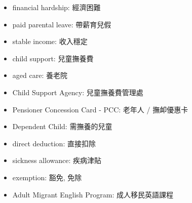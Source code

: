 \begin{multicols}{2}
\begin{itemize}
  \item financial hardship: 經濟困難
  \item paid parental leave: 帶薪育兒假
  \item stable income: 收入穩定
  \item child support: 兒童撫養費
  \item aged care: 養老院
  \item Child Support Agency: 兒童撫養費管理處
  \item Pensioner Concession Card - PCC: 老年人 / 撫卹優惠卡
  \item Dependent Child: 需撫養的兒童
  \item direct deduction: 直接扣除
  \item sickness allowance: 疾病津貼
  \item exemption: 豁免, 免除
  \item Adult Migrant English Program: 成人移民英語課程
\end{itemize}
\end{multicols}